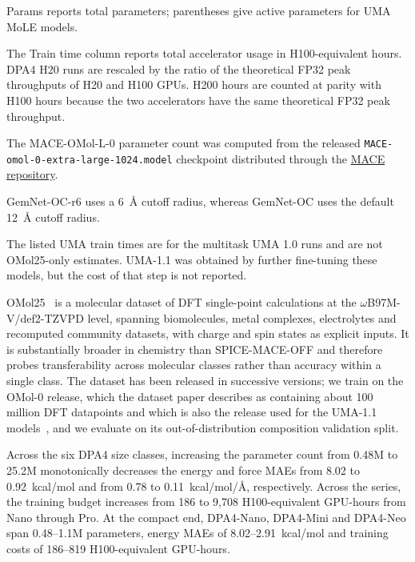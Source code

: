 \begin{table}[t]
\begin{threeparttable}
\begin{tablenotes}[flushleft]
            \item[d] Params reports total parameters; parentheses give active parameters for UMA MoLE models.
            \item[e] The Train time column reports total accelerator usage in H100-equivalent hours.
            DPA4 H20 runs are rescaled by the ratio of the theoretical FP32 peak throughputs of H20 and H100 GPUs.
            H200 hours are counted at parity with H100 hours because the two accelerators have the same theoretical FP32 peak throughput.
            \item[f] The MACE-OMol-L-0 parameter count was computed from the released \texttt{MACE-omol-0-extra-large-1024.model} checkpoint distributed through the \href{https://github.com/ACEsuit/mace}{MACE repository}.
            \item[g] GemNet-OC-r6 uses a 6~\AA{} cutoff radius, whereas GemNet-OC uses the default 12~\AA{} cutoff radius.
            \item[h] The listed UMA train times are for the multitask UMA 1.0 runs and are not OMol25-only estimates.
            UMA-1.1 was obtained by further fine-tuning these models, but the cost of that step is not reported.
        \end{tablenotes}
    \end{threeparttable}
\end{table}

OMol25~\cite{levine2025open} is a molecular dataset of DFT single-point calculations at the $\omega$B97M-V/def2-TZVPD level, spanning biomolecules, metal complexes, electrolytes and recomputed community datasets, with charge and spin states as explicit inputs.
It is substantially broader in chemistry than SPICE-MACE-OFF and therefore probes transferability across molecular classes rather than accuracy within a single class.
The dataset has been released in successive versions; we train on the OMol-0 release, which the dataset paper describes as containing about 100 million DFT datapoints and which is also the release used for the UMA-1.1 models~\cite{levine2025open}, and we evaluate on its out-of-distribution composition validation split.

Across the six DPA4 size classes, increasing the parameter count from 0.48M to 25.2M monotonically decreases the energy and force MAEs from 8.02 to 0.92~kcal/mol and from 0.78 to 0.11~kcal/mol/\AA{}, respectively.
Across the series, the training budget increases from 186 to 9,708 H100-equivalent GPU-hours from Nano through Pro.
At the compact end, DPA4-Nano, DPA4-Mini and DPA4-Neo span 0.48--1.1M parameters, energy MAEs of 8.02--2.91~kcal/mol and training costs of 186--819 H100-equivalent GPU-hours.

